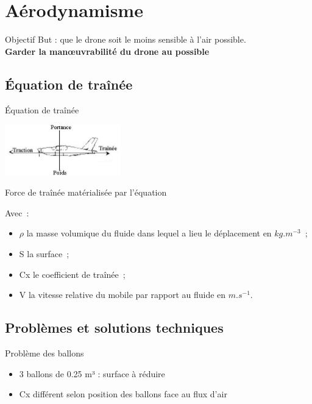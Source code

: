 

\section{Aérodynamisme}

\begin{frame}{Objectif}
 But : que le drone soit le moins sensible à l'air possible. \\
 \textbf{Garder la manœuvrabilité du drone au possible}
\end{frame}

\subsection{Équation de traînée}
\begin{frame}{Équation de traînée}
  \begin{center}
		\includegraphics[width=5cm]{../Images/portance.jpg}
	\end{center}
 Force de traînée matérialisée par l'équation \\
 \begin{center}
 \end{center}
 Avec~:
 \begin{itemize}
  \item $\rho$ la masse volumique du fluide dans lequel a lieu le déplacement en $kg.m^{-3}$~;
  \item S la surface~;
  \item Cx le coefficient de traînée~;
  \item V la vitesse relative du mobile par rapport au fluide en $m.s^{-1}$.
 \end{itemize}
\end{frame}

\subsection{Problèmes et solutions techniques}
\begin{frame}{Problème des ballons}
  \begin{itemize}
	\item 3 ballons de 0.25 m³ : surface à réduire
  \item Cx différent selon position des ballons face au flux d'air
\end{itemize}
\end{frame}

